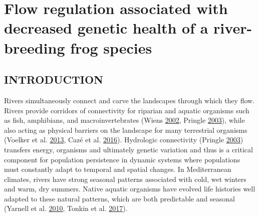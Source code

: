 \documentclass[proquest,12pt,final]{ucthesis-CA2012} %
\begin{document}
\begin{ucmainmatter}

\hypertarget{reg-health}{%
\chapter{Flow regulation associated with decreased genetic health of a
river-breeding frog species}\label{reg-health}}

\hypertarget{introduction}{%
\section{INTRODUCTION}\label{introduction}}

Rivers simultaneously connect and carve the landscapes through which
they flow. Rivers provide corridors of connectivity for riparian and
aquatic organisms such as fish, amphibians, and macroinvertebrates
(Wiens \protect\hyperlink{ref-wiens_riverine_2002}{2002}, Pringle
\protect\hyperlink{ref-pringle_what_2003}{2003}), while also acting as
physical barriers on the landscape for many terrestrial organisms
(Voelker et al. \protect\hyperlink{ref-voelker_river_2013}{2013}, Cazé
et al. \protect\hyperlink{ref-caze_could_2016}{2016}). Hydrologic
connectivity (Pringle \protect\hyperlink{ref-pringle_what_2003}{2003})
transfers energy, organisms and ultimately genetic variation and thus is
a critical component for population persistence in dynamic systems where
populations must constantly adapt to temporal and spatial changes. In
Mediterranean climates, rivers have strong seasonal patterns associated
with cold, wet winters and warm, dry summers. Native aquatic organisms
have evolved life histories well adapted to these natural patterns,
which are both predictable and seasonal (Yarnell et al.
\protect\hyperlink{ref-yarnell_ecology_2010}{2010}, Tonkin et al.
\protect\hyperlink{ref-tonkin_seasonality_2017}{2017}).


\end{ucmainmatter}
\end{document}
